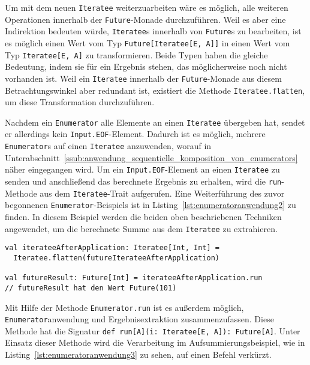 Um mit dem neuen \lstinline|Iteratee| weiterzuarbeiten wäre es möglich, alle weiteren Operationen innerhalb der \lstinline|Future|-Monade durchzuführen.
Weil es aber eine Indirektion bedeuten würde, \lstinline|Iteratee|s innerhalb von \lstinline|Future|s zu bearbeiten, ist es möglich einen Wert vom Typ \lstinline|Future[Iteratee[E, A]]| in einen Wert vom Typ \lstinline|Iteratee[E, A]| zu transformieren.
Beide Typen haben die gleiche Bedeutung, indem sie für ein Ergebnis stehen, das möglicherweise noch nicht vorhanden ist.
Weil ein \lstinline|Iteratee| innerhalb der \lstinline|Future|-Monade aus diesem Betrachtungswinkel aber redundant ist, existiert die Methode \lstinline|Iteratee.flatten|, um diese Transformation durchzuführen.


Nachdem ein \lstinline|Enumerator| alle Elemente an einen \lstinline|Iteratee| übergeben hat, sendet er allerdings kein \lstinline|Input.EOF|-Element.
Dadurch ist es möglich, mehrere \lstinline|Enumerator|s auf einen \lstinline|Iteratee| anzuwenden, worauf in Unterabschnitt~\ref{ssub:anwendung_sequentielle_komposition_von_enumerators} näher eingegangen wird.
Um ein \lstinline|Input.EOF|-Element an einen \lstinline|Iteratee| zu senden und anschließend das berechnete Ergebnis zu erhalten, wird die \lstinline|run|-Methode aus dem \lstinline|Iteratee|-Trait aufgerufen.
Eine Weiterführung des zuvor begonnenen \lstinline|Enumerator|-Beispiels ist in Listing~\ref{lst:enumeratoranwendung2} zu finden.
In diesem Beispiel werden die beiden oben beschriebenen Techniken angewendet, um die berechnete Summe aus dem \lstinline|Iteratee| zu extrahieren.

\begin{lstlisting}[caption=Extrahierung des Ergebnisses aus einem Iteratee, label=lst:enumeratoranwendung2]
val iterateeAfterApplication: Iteratee[Int, Int] =
  Iteratee.flatten(futureIterateeAfterApplication)

val futureResult: Future[Int] = iterateeAfterApplication.run
// futureResult hat den Wert Future(101)
\end{lstlisting}

Mit Hilfe der Methode \lstinline|Enumerator.run| ist es außerdem möglich, \lstinline|Enumerator|anwendung und Ergebnisextraktion zusammenzufassen.
Diese Methode hat die Signatur \lstinline[breaklines=true]|def run[A](i: Iteratee[E, A]): Future[A]|.
Unter Einsatz dieser Methode wird die Verarbeitung im Aufsummierungsbeispiel, wie in Listing~\ref{lst:enumeratoranwendung3} zu sehen, auf einen Befehl verkürzt.


